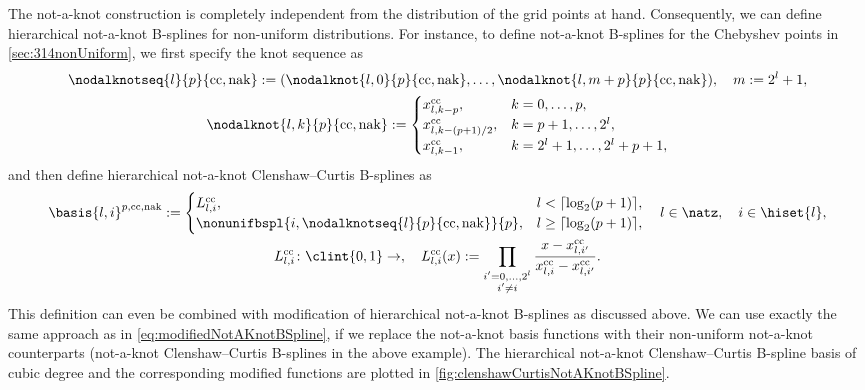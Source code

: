 The not-a-knot construction is completely independent from the
distribution of the grid points at hand.
Consequently, we can define hierarchical not-a-knot B-splines
for non-uniform distributions.
For instance, to define not-a-knot B-splines for the
Chebyshev points in \cref{sec:314nonUniform},
we first specify the knot sequence as
\begin{subequations}
  \begin{gather}
    \nodalknotseq{l}{p}{\clenshawcurtis,\notaknot}
    := (\nodalknot{l,0}{p}{\clenshawcurtis,\notaknot}, \dotsc,
    \nodalknot{l,m+p}{p}{\clenshawcurtis,\notaknot}),\quad
    m := 2^l + 1,\\
    \nodalknot{l,k}{p}{\clenshawcurtis,\notaknot}
    :=
    \begin{cases}
      \gp{l,k-p}^\clenshawcurtis,&
      k = 0, \dotsc, p,\\
      \gp{l,k-(p+1)/2}^\clenshawcurtis,&
      k = p + 1, \dotsc, 2^l,\\
      \gp{l,k-1}^\clenshawcurtis,&
      k = 2^l + 1, \dotsc, 2^l + p + 1,
    \end{cases}
  \end{gather}
\end{subequations}
and then define hierarchical not-a-knot Clenshaw--Curtis B-splines as
\begin{subequations}
  \begin{gather}
    \basis{l,i}^{p,\clenshawcurtis,\notaknot}
    :=
    \begin{cases}
      L_{l,i}^\clenshawcurtis,&
      l < \lceil\log_2(p+1)\rceil,\\
      \nonunifbspl{i,\nodalknotseq{l}{p}{\clenshawcurtis,\notaknot}}{p},&
      l \ge \lceil\log_2(p+1)\rceil,
    \end{cases}\quad
    l \in \natz,\quad
    i \in \hiset{l},\\
    L_{l,i}^\clenshawcurtis\colon \clint{0, 1} \to \real,\quad
    L_{l,i}^\clenshawcurtis(x)
    := \prod_{\substack{i'=0,\dotsc,2^l\\i'\not=i}}
    \frac{x - \gp{l,i'}^\clenshawcurtis}%
    {\gp{l,i}^\clenshawcurtis - \gp{l,i'}^\clenshawcurtis}.
  \end{gather}
\end{subequations}
This definition can even be combined with modification
of hierarchical not-a-knot B-splines as discussed above.
We can use exactly the same approach as in
\eqref{eq:modifiedNotAKnotBSpline}, if we replace the
not-a-knot basis functions with their non-uniform not-a-knot counterparts
(not-a-knot Clenshaw--Curtis B-splines in the above example).
The hierarchical not-a-knot Clenshaw--Curtis B-spline basis of
cubic degree and the corresponding modified functions are plotted in
\cref{fig:clenshawCurtisNotAKnotBSpline}.

